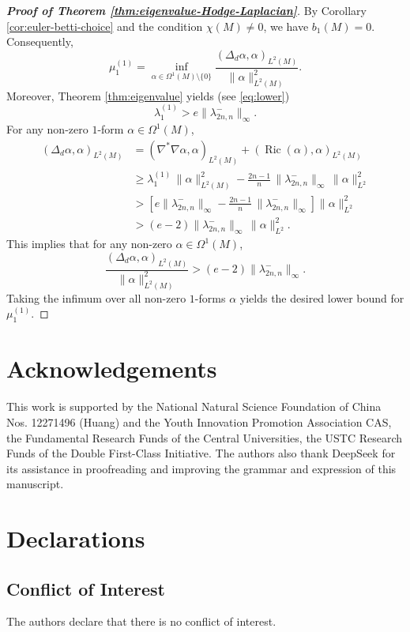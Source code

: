 \documentclass[12pt, twoside]{article}
\theoremstyle{definition}
\numberwithin{equation}{section}
\begin{document}
\begin{proof}[\textbf{Proof of Theorem \ref{thm:eigenvalue-Hodge-Laplacian}}]
	By Corollary \ref{cor:euler-betti-choice} and the condition $\chi(M)\neq 0$, we have $b_{1}(M)=0$. Consequently,
	\[
	\mu^{(1)}_{1}= \inf_{\alpha \in \Omega^{1}(M)\setminus\{0\}} 
	\frac{(\Delta_{d}\alpha,\alpha)_{L^{2}(M)}}{\|\alpha\|^{2}_{L^{2}(M)}} .
	\]
	Moreover, Theorem \ref{thm:eigenvalue} yields (see \eqref{eq:lower})
	\[
	\lambda^{(1)}_{1} > e\|\lambda^{-}_{2n,n}\|_{\infty}.
	\]
	For any non-zero $1$-form $\alpha\in \Omega^{1}(M)$,
	\begin{align*}
	(\Delta_{d}\alpha,\alpha)_{L^{2}(M)}
	&= (\nabla^{*}\nabla\alpha,\alpha)_{L^{2}(M)} + (\operatorname{Ric}(\alpha),\alpha)_{L^{2}(M)} \\
	&\ge \lambda^{(1)}_{1}\,\|\alpha\|^{2}_{L^{2}(M)} 
	- \frac{2n-1}{n}\,\|\lambda^{-}_{2n,n}\|_{\infty}\,\|\alpha\|^{2}_{L^{2}} \\
	&> \left[ e\|\lambda^{-}_{2n,n}\|_{\infty} 
	- \frac{2n-1}{n}\,\|\lambda^{-}_{2n,n}\|_{\infty} \right] \|\alpha\|^{2}_{L^{2}} \\
	&> (e-2)\|\lambda^{-}_{2n,n}\|_{\infty}\,\|\alpha\|^{2}_{L^{2}}.
	\end{align*}
	This implies that for any non-zero $\alpha\in \Omega^{1}(M)$,
	\[
	\frac{(\Delta_{d}\alpha,\alpha)_{L^{2}(M)}}{\|\alpha\|^{2}_{L^{2}(M)}} 
	> (e-2)\|\lambda^{-}_{2n,n}\|_{\infty}.
	\]
	Taking the infimum over all non-zero $1$-forms $\alpha$ yields the desired lower bound for $\mu^{(1)}_{1}$.
\end{proof}
	\section*{Acknowledgements}
	This work is supported by the National Natural Science Foundation of China Nos. 12271496 (Huang) and the Youth Innovation Promotion Association CAS, the Fundamental Research Funds of the Central Universities, the USTC Research Funds of the Double First-Class Initiative. The authors also thank DeepSeek for its assistance in proofreading and improving the grammar and expression of this manuscript.
	
	\section*{Declarations}
	
	\subsection*{Conflict of Interest}
	The authors declare that there is no conflict of interest.
	
\end{document}
